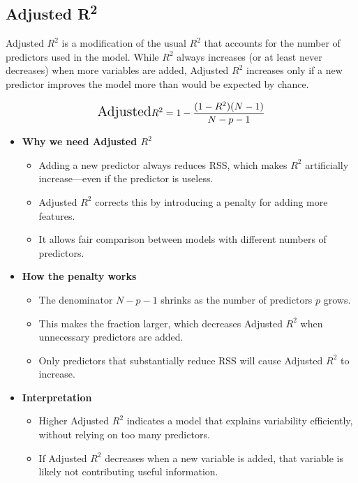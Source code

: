 \documentclass[11pt,a4paper]{article}
\begin{document}
\subsection{Adjusted R\textsuperscript{2}}
Adjusted $R^2$ is a modification of the usual $R^2$ that accounts for the number of predictors used in the model.  
While $R^2$ always increases (or at least never decreases) when more variables are added,  
Adjusted $R^2$ increases only if a new predictor improves the model more than would be expected by chance.

\begin{align*}
    \Large \text{Adjusted} R^2 
    =  1 - \frac{(1 - R^2)(N - 1)}{N - p - 1}
\end{align*}


\begin{itemize}

    \item \textbf{Why we need Adjusted $R^2$}
    \begin{itemize}
        \item Adding a new predictor always reduces RSS, which makes $R^2$ artificially increase—even if the predictor is useless.
        \item Adjusted $R^2$ corrects this by introducing a penalty for adding more features.
        \item It allows fair comparison between models with different numbers of predictors.
    \end{itemize}

    \item \textbf{How the penalty works}
    \begin{itemize}
        \item The denominator $N - p - 1$ shrinks as the number of predictors $p$ grows.
        \item This makes the fraction larger, which decreases Adjusted $R^2$ when unnecessary predictors are added.
        \item Only predictors that substantially reduce RSS will cause Adjusted $R^2$ to increase.
    \end{itemize}

    \item \textbf{Interpretation}
    \begin{itemize}
        \item Higher Adjusted $R^2$ indicates a model that explains variability efficiently, without relying on too many predictors.
        \item If Adjusted $R^2$ decreases when a new variable is added, that variable is likely not contributing useful information.
    \end{itemize}

\end{itemize}
\end{document}

